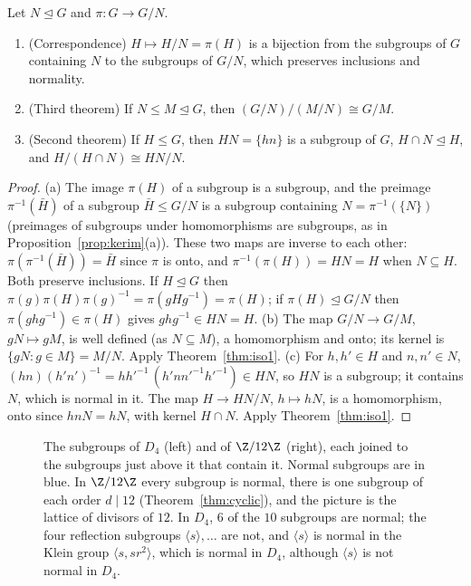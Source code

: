 \begin{theorem}\label{thm:iso23}
Let $N\trianglelefteq G$ and $\pi:G\to G/N$.
\begin{enumerate}[label=(\alph*)]
\item (Correspondence) $H\mapsto H/N=\pi(H)$ is a bijection from the subgroups of $G$ containing $N$ to the subgroups of $G/N$, which preserves inclusions and normality.
\item (Third theorem) If $N\le M\trianglelefteq G$, then $(G/N)/(M/N)\cong G/M$.
\item (Second theorem) If $H\le G$, then $HN=\{hn\}$ is a subgroup of $G$, $H\cap N\trianglelefteq H$, and $H/(H\cap N)\cong HN/N$.
\end{enumerate}
\end{theorem}
\begin{proof}
(a) The image $\pi(H)$ of a subgroup is a subgroup, and the preimage $\pi^{-1}(\bar H)$ of a subgroup $\bar H\le G/N$ is a subgroup containing $N=\pi^{-1}(\{N\})$ (preimages of subgroups under homomorphisms are subgroups, as in Proposition~\ref{prop:kerim}(a)). These two maps are inverse to each other: $\pi(\pi^{-1}(\bar H))=\bar H$ since $\pi$ is onto, and $\pi^{-1}(\pi(H))=HN=H$ when $N\subseteq H$. Both preserve inclusions. If $H\trianglelefteq G$ then $\pi(g)\pi(H)\pi(g)^{-1}=\pi(gHg^{-1})=\pi(H)$; if $\pi(H)\trianglelefteq G/N$ then $\pi(ghg^{-1})\in\pi(H)$ gives $ghg^{-1}\in HN=H$.
(b) The map $G/N\to G/M$, $gN\mapsto gM$, is well defined (as $N\subseteq M$), a homomorphism and onto; its kernel is $\{gN:g\in M\}=M/N$. Apply Theorem~\ref{thm:iso1}.
(c) For $h,h'\in H$ and $n,n'\in N$, $(hn)(h'n')^{-1}=hh'^{-1}\,(h'n n'^{-1}h'^{-1})\in HN$, so $HN$ is a subgroup; it contains $N$, which is normal in it. The map $H\to HN/N$, $h\mapsto hN$, is a homomorphism, onto since $hnN=hN$, with kernel $H\cap N$. Apply Theorem~\ref{thm:iso1}.
\end{proof}

\begin{figure}[ht]
\centering
{}
\caption{The subgroups of $D_4$ (left) and of $\Z/12\Z$ (right), each joined to the subgroups just above it that contain it. Normal subgroups are in blue. In $\Z/12\Z$ every subgroup is normal, there is one subgroup of each order $d\mid12$ (Theorem~\ref{thm:cyclic}), and the picture is the lattice of divisors of $12$. In $D_4$, $6$ of the $10$ subgroups are normal; the four reflection subgroups $\langle s\rangle,\dots$ are not, and $\langle s\rangle$ is normal in the Klein group $\langle s,sr^2\rangle$, which is normal in $D_4$, although $\langle s\rangle$ is not normal in $D_4$.}
\label{fig:lattices}
\end{figure}

